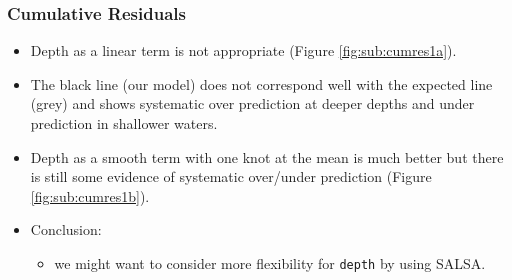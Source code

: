 \begin{frame}
\frametitle{Cumulative Residuals}
\begin{itemize}
\item Depth as a linear term is not appropriate (Figure \ref{fig:sub:cumres1a}).
\item The black line (our model) does not correspond well with the expected line (grey) and shows systematic over prediction at deeper depths and under prediction in shallower waters.
\item Depth as a smooth term with one knot at the mean is much better but there is still some evidence of systematic over/under prediction (Figure \ref{fig:sub:cumres1b}).
\pause
\item Conclusion:  
\begin{itemize}
  \item we might want to consider more flexibility for {\tt depth} by using SALSA.
\end{itemize}
\end{itemize}
\end{frame}


